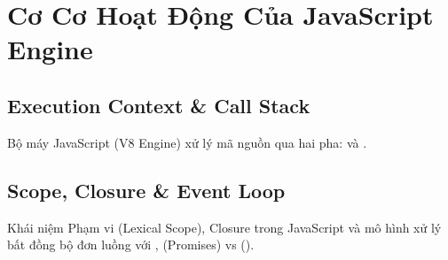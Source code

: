\chapter{Cơ Cơ Hoạt Động Của JavaScript Engine}
\label{chap:js_engine_execution}

\section{Execution Context \& Call Stack}
Bộ máy JavaScript (V8 Engine) xử lý mã nguồn qua hai pha:  và .

\section{Scope, Closure \& Event Loop}
Khái niệm Phạm vi (Lexical Scope), Closure trong JavaScript và mô hình xử lý bất đồng bộ đơn luồng với ,  (Promises) vs  ().
